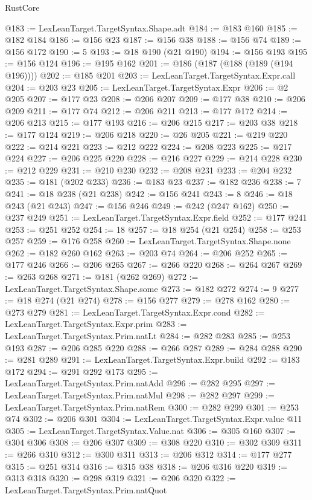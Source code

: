 \begin{lexlean}{RustCore}
\begin{coremodule}
@183 := LexLeanTarget.TargetSyntax.Shape.adt
@184 := @183 @160
@185 := @182 @184
@186 := @156 @23
@187 := @156 @38
@188 := @156 @74
@189 := @156 @172
@190 := 5
@193 := @18 @190 (@21 @190)
@194 := @156 @193
@195 := @156 @124
@196 := @195 @162
@201 := @186 (@187 (@188 (@189 (@194 @196))))
@202 := @185 @201
@203 := LexLeanTarget.TargetSyntax.Expr.call
@204 := @203 @23
@205 := LexLeanTarget.TargetSyntax.Expr
@206 := @2 @205
@207 := @177 @23
@208 := @206 @207
@209 := @177 @38
@210 := @206 @209
@211 := @177 @74
@212 := @206 @211
@213 := @177 @172
@214 := @206 @213
@215 := @177 @193
@216 := @206 @215
@217 := @203 @38
@218 := @177 @124
@219 := @206 @218
@220 := @26 @205
@221 := @219 @220
@222 := @214 @221
@223 := @212 @222
@224 := @208 @223
@225 := @217 @224
@227 := @206 @225 @220
@228 := @216 @227
@229 := @214 @228
@230 := @212 @229
@231 := @210 @230
@232 := @208 @231
@233 := @204 @232
@235 := @181 (@202 @233)
@236 := @183 @23
@237 := @182 @236
@238 := 7
@241 := @18 @238 (@21 @238)
@242 := @156 @241
@243 := 8
@246 := @18 @243 (@21 @243)
@247 := @156 @246
@249 := @242 (@247 @162)
@250 := @237 @249
@251 := LexLeanTarget.TargetSyntax.Expr.field
@252 := @177 @241
@253 := @251 @252
@254 := 18
@257 := @18 @254 (@21 @254)
@258 := @253 @257
@259 := @176 @258
@260 := LexLeanTarget.TargetSyntax.Shape.none
@262 := @182 @260 @162
@263 := @203 @74
@264 := @206 @252
@265 := @177 @246
@266 := @206 @265
@267 := @266 @220
@268 := @264 @267
@269 := @263 @268
@271 := @181 (@262 @269)
@272 := LexLeanTarget.TargetSyntax.Shape.some
@273 := @182 @272
@274 := 9
@277 := @18 @274 (@21 @274)
@278 := @156 @277
@279 := @278 @162
@280 := @273 @279
@281 := LexLeanTarget.TargetSyntax.Expr.cond
@282 := LexLeanTarget.TargetSyntax.Expr.prim
@283 := LexLeanTarget.TargetSyntax.Prim.natLt
@284 := @282 @283
@285 := @253 @193
@287 := @206 @285 @220
@288 := @266 @287
@289 := @284 @288
@290 := @281 @289
@291 := LexLeanTarget.TargetSyntax.Expr.build
@292 := @183 @172
@294 := @291 @292 @173
@295 := LexLeanTarget.TargetSyntax.Prim.natAdd
@296 := @282 @295
@297 := LexLeanTarget.TargetSyntax.Prim.natMul
@298 := @282 @297
@299 := LexLeanTarget.TargetSyntax.Prim.natRem
@300 := @282 @299
@301 := @253 @74
@302 := @206 @301
@304 := LexLeanTarget.TargetSyntax.Expr.value @11
@305 := LexLeanTarget.TargetSyntax.Value.nat
@306 := @305 @160
@307 := @304 @306
@308 := @206 @307
@309 := @308 @220
@310 := @302 @309
@311 := @266 @310
@312 := @300 @311
@313 := @206 @312
@314 := @177 @277
@315 := @251 @314
@316 := @315 @38
@318 := @206 @316 @220
@319 := @313 @318
@320 := @298 @319
@321 := @206 @320
@322 := LexLeanTarget.TargetSyntax.Prim.natQuot

\end{coremodule}
\end{lexlean}
